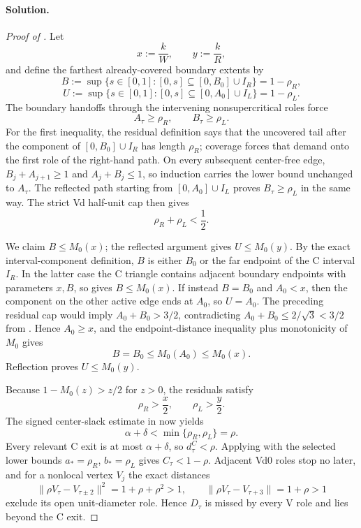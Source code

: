 \paragraph{Solution.}

\begin{proof}[Proof of ]
Let
\[
 x:=\frac{k}{W},\qquad y:=\frac{k}{R},
\]
and define the farthest already-covered boundary extents by
\[
 B:=\sup\{s\in[0,1]:[0,s]\subseteq[0,B_0]\cup I_R\}=1-\rho_R,
\]
\[
 U:=\sup\{s\in[0,1]:[0,s]\subseteq[0,A_0]\cup I_L\}=1-\rho_L.
\]
The boundary handoffs through the intervening nonsupercritical roles force
\[
 A_\tau\ge\rho_R,
 \qquad B_\tau\ge\rho_L.
\]
For the first inequality, the residual definition says that the uncovered
tail after the component of $[0,B_0]\cup I_R$ has length $\rho_R$; coverage
forces that demand onto the first role of the right-hand path.  On every
subsequent center-free edge, $B_j+A_{j+1}\ge1$ and
$A_j+B_j\le1$, so induction carries the lower bound unchanged to
$A_\tau$.  The reflected path starting from $[0,A_0]\cup I_L$ proves
$B_\tau\ge\rho_L$ in the same way.
The strict Vd half-unit cap then gives
\[
 \rho_R+\rho_L<\frac12.
\]

We claim $B\le M_0(x)$; the reflected argument gives $U\le M_0(y)$.  By the
exact interval-component definition, $B$ is either
$B_0$ or the far endpoint of the C interval $I_R$.  In the latter case the
C triangle contains adjacent boundary endpoints with parameters $x,B$, so
 gives $B\le M_0(x)$.
If instead $B=B_0$ and $A_0<x$, then the component on the other active edge
ends at $A_0$, so $U=A_0$.  The preceding residual cap would imply
$A_0+B_0>3/2$, contradicting
$A_0+B_0\le2/\sqrt3<3/2$ from
.  Hence $A_0\ge x$, and the endpoint-distance
inequality plus monotonicity of $M_0$ gives
\[
 B=B_0\le M_0(A_0)\le M_0(x).
\]
Reflection proves $U\le M_0(y)$.

Because $1-M_0(z)>z/2$ for $z>0$, the residuals satisfy
\[
 \rho_R>\frac x2,
 \qquad \rho_L>\frac y2.
\]
The signed center-slack estimate in
 now yields
\[
 \alpha+\delta<\min\{\rho_R,\rho_L\}=\rho.
\]
Every relevant C exit is at most $\alpha+\delta$, so $d_\tau^C<\rho$.
Applying  with the selected lower bounds
$a_*=\rho_R$, $b_*=\rho_L$ gives
$C_\tau<1-\rho$.  Adjacent Vd0 roles stop no later, and for a nonlocal
vertex $V_j$ the exact distances
\[
 \lVert\rho V_\tau-V_{\tau\pm2}\rVert^2=1+\rho+\rho^2>1,
 \qquad
 \lVert\rho V_\tau-V_{\tau+3}\rVert=1+\rho>1
\]
exclude its open unit-diameter role.  Hence $D_\tau$ is missed by every V
role and lies beyond the C exit.
\end{proof}

